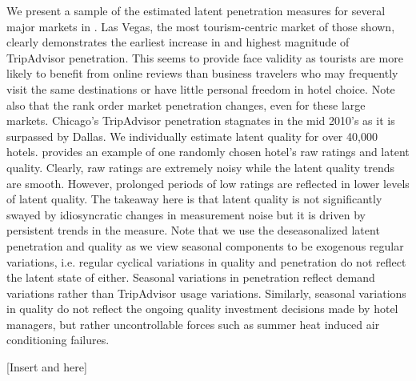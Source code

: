 \documentclass[mksc,blindrev]{informs3} %
\begin{document}

We present a sample of the estimated latent penetration measures for several major markets in . Las Vegas, the most tourism-centric market of those shown, clearly demonstrates the earliest increase in and highest magnitude of TripAdvisor penetration. This seems to provide face validity as tourists are more likely to benefit from online reviews than business travelers who may frequently visit the same destinations or have little personal freedom in hotel choice. Note also that the rank order market penetration changes, even for these large markets. Chicago's TripAdvisor penetration stagnates in the mid 2010's as it is surpassed by Dallas. We individually estimate latent quality for over 40,000 hotels.  provides an example of one randomly chosen hotel's raw ratings and latent quality. Clearly, raw ratings are extremely noisy while the latent quality trends are smooth. However, prolonged periods of low ratings are reflected in lower levels of latent quality. The takeaway here is that latent quality is not significantly swayed by idiosyncratic changes in measurement noise but it is driven by persistent trends in the measure. Note that we use the deseasonalized latent penetration and quality as we view seasonal components to be exogenous regular variations, i.e. regular cyclical variations in quality and penetration do not reflect the latent state of either. Seasonal variations in penetration reflect demand variations rather than TripAdvisor usage variations. Similarly, seasonal variations in quality do not reflect the ongoing quality investment decisions made by hotel managers, but rather uncontrollable forces such as summer heat induced air conditioning failures.

[Insert  and  here]


\end{document}
